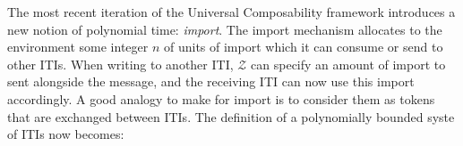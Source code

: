 The most recent iteration of the Universal Composability framework introduces a new notion of polynomial time: \textit{import}.
The import mechanism allocates to the environment some integer $n$ of units of import which it can consume or send to other ITIs.
When writing to another ITI, $\mathcal{Z}$ can specify an amount of import to sent alongside the message, and the receiving ITI can now use this import accordingly.
A good analogy to make for import is to consider them as tokens that are exchanged between ITIs. 
The definition of a polynomially bounded syste of ITIs now becomes: 



